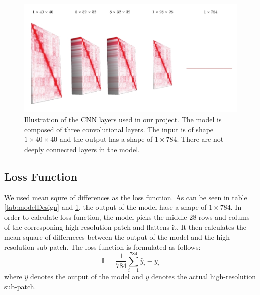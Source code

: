 \documentclass{article}
\begin{document}
\begin{figure}[H]
    \centering
    \includegraphics[width=\textwidth]{model.jpg}
    \caption{Illustration of the CNN layers used in
    our project. The model is composed of three
    convolutional layers. The input is of shape
    $1\times40\times40$ and the output has a
    shape of $1\times784$. There are not deeply
    connected layers in the model.}
    \label{fig:modelDesign}
\end{figure}
\subsection{Loss Function}
We used mean squre of
differences as the loss function. As can be
seen in table \ref{tab:modelDesign} and 
\ref{fig:modelDesign}, the output of
the model hase a shape of $1 \times 784$.
In order to calculate loss function,
the model picks the middle 28 rows and colums of the
corresponing high-resolution patch and flattens
it. It then calculates the mean square of differneces
between the output of the model and the high-resolution
sub-patch. The loss function is formulated as follows:
\begin{equation}
    \mathbb{L} = 
    \frac{1}{784}\sum_{i=1}^{784}{\hat{y}_i - y_i}
\end{equation}
where $\hat{y}$ denotes the output of the model and
$y$ denotes the actual high-resolution sub-patch.
\end{document}

